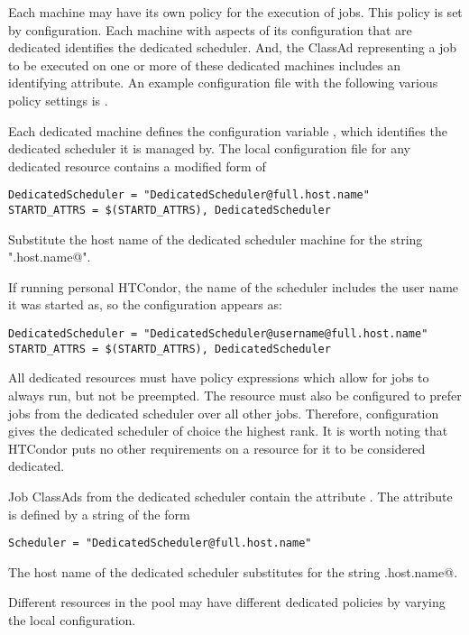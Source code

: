 Each machine may have its own policy for the execution of jobs.
This policy is set by configuration.
Each machine with aspects of its configuration that are dedicated
identifies the dedicated scheduler.
And, the ClassAd representing a job to be executed on
one or more of these dedicated machines includes an identifying attribute.
An example configuration file with the following various policy settings
is .

Each dedicated machine defines the configuration variable
, which identifies
the dedicated scheduler it is managed by.
The local configuration file for any dedicated resource contains
a modified form of

\begin{verbatim}
DedicatedScheduler = "DedicatedScheduler@full.host.name"
STARTD_ATTRS = $(STARTD_ATTRS), DedicatedScheduler
\end{verbatim}

Substitute the host name of the dedicated scheduler
machine for the string "\verb@full.host.name@". 

If running personal HTCondor, the name of the scheduler includes
the user name it was started as, so the configuration appears as:

\begin{verbatim}
DedicatedScheduler = "DedicatedScheduler@username@full.host.name"
STARTD_ATTRS = $(STARTD_ATTRS), DedicatedScheduler
\end{verbatim}

All dedicated resources must have policy expressions which allow for
jobs to always run, but not be preempted.
The resource must also be configured to prefer jobs from the dedicated 
scheduler over all other jobs.
Therefore, configuration gives
the dedicated scheduler of choice the highest rank.
It is worth noting that HTCondor puts no other requirements on a
resource for it to be considered dedicated.  

Job ClassAds from the dedicated scheduler 
contain the attribute .
The attribute is defined by a string of the form 
\begin{verbatim}
Scheduler = "DedicatedScheduler@full.host.name"
\end{verbatim}
The host name of the dedicated scheduler
substitutes for the string \verb@full.host.name@. 

Different resources in the pool may have different dedicated policies
by varying the local configuration.

